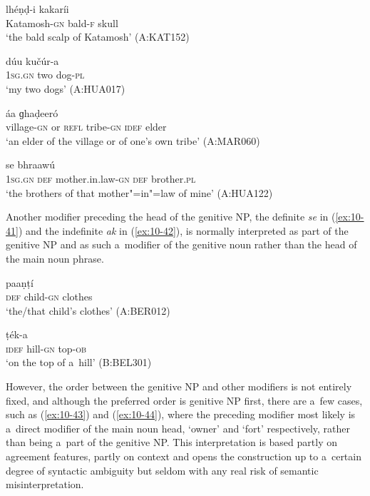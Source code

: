 \begin{exe}
\ex
\label{ex:10-37}
\gll [kaṭamuš-íi] lhéṇḍ-i kakaríi \\
Katamosh-\textsc{gn} bald-\textsc{f} skull \\
\glt `the bald scalp of Katamosh' (A:KAT152)

\ex
\label{ex:10-38}
\gll [míi] dúu kučúr-a \\
\textsc{1sg.gn} two dog-\textsc{pl}  \\
\glt `my two dogs' (A:HUA017)

\ex
\label{ex:10-39}
 áa ɡhaḍeeró  \\
village-\textsc{gn} or \textsc{refl} tribe-\textsc{gn} \textsc{idef} elder \\
\glt `an elder of the village or of one's own tribe' (A:MAR060)

\ex
\label{ex:10-40}
 se bhraawú \\
\textsc{1sg.gn} \textsc{def} mother.in.law-\textsc{gn} \textsc{def} brother.\textsc{pl}  \\
\glt `the brothers of that mother"=in"=law of mine' (A:HUA122)
\end{exe}


Another modifier preceding the head of the genitive NP, the definite \textit{se} in (\ref{ex:10-41}) and the indefinite \textit{ak} in (\ref{ex:10-42}), is normally interpreted as part of the genitive NP and as such a~modifier of the genitive noun rather than the head of the main noun phrase.

\begin{exe}
\ex
\label{ex:10-41}
\gll [se kuṇaak-íi] paaṇṭí \\
\textsc{def} child-\textsc{gn} clothes  \\
\glt `the/that child's clothes' (A:BER012)

\ex
\label{ex:10-42}
\gll [ak táapeṛ-e] ṭék-a \\
\textsc{idef} hill-\textsc{gn} top-\textsc{ob}  \\
\glt `on the top of a~hill' (B:BEL301)
\end{exe}


However, the order between the genitive NP and other modifiers is not entirely fixed, and although the preferred order is genitive NP first, there are a~few cases, such as (\ref{ex:10-43}) and (\ref{ex:10-44}), where the preceding modifier most likely is a~direct modifier of the main noun head, `owner' and `fort' respectively, rather than being a~part of the genitive NP. This interpretation is based partly on agreement features, partly on context and opens the construction up to a~certain degree of syntactic ambiguity but seldom with any real risk of semantic misinterpretation.

